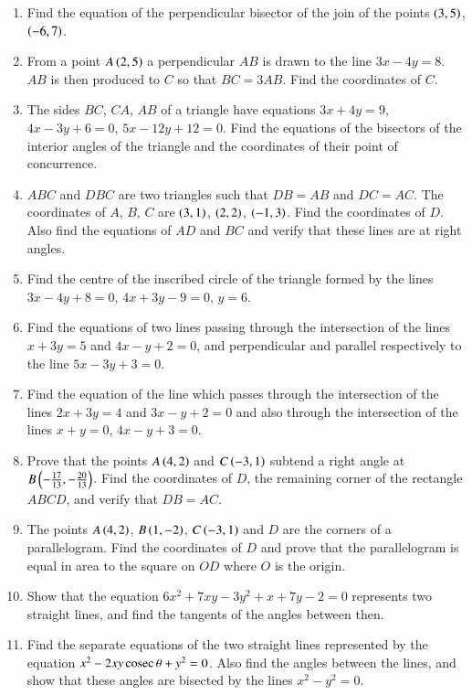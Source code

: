 \begin{enumerate}[1.]
\item Find the equation of the perpendicular bisector of the join of the points $\left(3,5\right)$, $\left(-6,7\right)$.
\item From a point $A \left(2,5\right)$ a perpendicular $AB$ is drawn to the line $3x-4y=8$.  $AB$ is then produced to $C$ so that $BC=3AB$.  Find
the coordinates of $C$.
\item The sides $BC$, $CA$, $AB$ of a triangle have equations $3x+4y=9$, $4x-3y+6=0$, $5x-12y+12=0$.  Find the equations of the
bisectors of the interior angles of the triangle and the coordinates of their point
of concurrence.
\item $ABC$ and $DBC$ are two triangles such that $DB=AB$ and $DC=AC$.  The coordinates of $A$, $B$, $C$
are $\left(3,1\right)$, $\left(2,2\right)$, $\left(-1,3\right)$.  Find the coordinates of $D$.  Also find the equations of $AD$ and $BC$ and verify that these lines are at right angles.
\item Find the centre of the inscribed circle of the triangle formed by the lines $3x-4y+8=0$, $4x+3y-9=0$, $y=6$.
\item Find the equations of two lines passing through the intersection of the lines $x+3y=5$ and $4x-y+2=0$,
and perpendicular and parallel respectively to the line $5x-3y+3=0$.
\item Find the equation of the line which passes through the intersection of the lines $2x+3y=4$ and $3x-y+2=0$
and also through the intersection of the lines $x+y=0$, $4x-y+3=0$.
\item Prove that the points $A \left(4,2\right)$ and $C \left(-3,1\right)$ subtend a right angle at $B \left(-\frac{17}{13}, -\frac{20}{13}\right)$.  Find the coordinates of $D$, the remaining
corner of the rectangle $ABCD$, and verify that $DB=AC$.
\item The points $A \left(4,2\right)$, $B \left(1,-2\right)$, $C \left(-3,1\right)$ and $D$ are the corners of a parallelogram.
Find the coordinates of $D$ and prove that the parallelogram is equal in area to the square on $OD$
where $O$ is the origin.
\item Show that the equation $6x^2+7xy-3y^2+x+7y-2=0$ represents two straight lines, and find the tangents of the angles between then.
\item Find the separate equations of the two straight lines represented by the
equation $x^2-2xy\,\text{cosec}\,\theta + y^2 = 0$.  Also find the angles between the lines, and show that these angles are bisected by the lines
$x^2-y^2 = 0$.
\end{enumerate}
